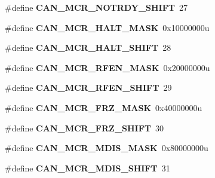 \begin{DoxyCompactItemize}
\item 
\#define {\bfseries C\+A\+N\+\_\+\+M\+C\+R\+\_\+\+N\+O\+T\+R\+D\+Y\+\_\+\+S\+H\+I\+FT}~27\hypertarget{group__CAN__Register__Masks_ga90886e532a436fbd5b6e94e723acd148}{}\label{group__CAN__Register__Masks_ga90886e532a436fbd5b6e94e723acd148}

\item 
\#define {\bfseries C\+A\+N\+\_\+\+M\+C\+R\+\_\+\+H\+A\+L\+T\+\_\+\+M\+A\+SK}~0x10000000u\hypertarget{group__CAN__Register__Masks_gad5282ba01498ad05fa9ce4387050f1df}{}\label{group__CAN__Register__Masks_gad5282ba01498ad05fa9ce4387050f1df}

\item 
\#define {\bfseries C\+A\+N\+\_\+\+M\+C\+R\+\_\+\+H\+A\+L\+T\+\_\+\+S\+H\+I\+FT}~28\hypertarget{group__CAN__Register__Masks_gab976a082962ddeb0a7738bc5385b35da}{}\label{group__CAN__Register__Masks_gab976a082962ddeb0a7738bc5385b35da}

\item 
\#define {\bfseries C\+A\+N\+\_\+\+M\+C\+R\+\_\+\+R\+F\+E\+N\+\_\+\+M\+A\+SK}~0x20000000u\hypertarget{group__CAN__Register__Masks_ga55cd060ac6cdad670aeb97522a118930}{}\label{group__CAN__Register__Masks_ga55cd060ac6cdad670aeb97522a118930}

\item 
\#define {\bfseries C\+A\+N\+\_\+\+M\+C\+R\+\_\+\+R\+F\+E\+N\+\_\+\+S\+H\+I\+FT}~29\hypertarget{group__CAN__Register__Masks_gaffab6b0e09ace8e09cb1487dd6639955}{}\label{group__CAN__Register__Masks_gaffab6b0e09ace8e09cb1487dd6639955}

\item 
\#define {\bfseries C\+A\+N\+\_\+\+M\+C\+R\+\_\+\+F\+R\+Z\+\_\+\+M\+A\+SK}~0x40000000u\hypertarget{group__CAN__Register__Masks_ga1b55e4024cec7ad30bcba945a70c3383}{}\label{group__CAN__Register__Masks_ga1b55e4024cec7ad30bcba945a70c3383}

\item 
\#define {\bfseries C\+A\+N\+\_\+\+M\+C\+R\+\_\+\+F\+R\+Z\+\_\+\+S\+H\+I\+FT}~30\hypertarget{group__CAN__Register__Masks_gae3aac50a6bba3516d60fd881e8a8b069}{}\label{group__CAN__Register__Masks_gae3aac50a6bba3516d60fd881e8a8b069}

\item 
\#define {\bfseries C\+A\+N\+\_\+\+M\+C\+R\+\_\+\+M\+D\+I\+S\+\_\+\+M\+A\+SK}~0x80000000u\hypertarget{group__CAN__Register__Masks_gaadea43214ec6dcbab21d59988ae401bb}{}\label{group__CAN__Register__Masks_gaadea43214ec6dcbab21d59988ae401bb}

\item 
\#define {\bfseries C\+A\+N\+\_\+\+M\+C\+R\+\_\+\+M\+D\+I\+S\+\_\+\+S\+H\+I\+FT}~31\hypertarget{group__CAN__Register__Masks_ga15f1bf3b87536155c2b13f279b06ba93}{}\label{group__CAN__Register__Masks_ga15f1bf3b87536155c2b13f279b06ba93}


\end{DoxyCompactItemize}
